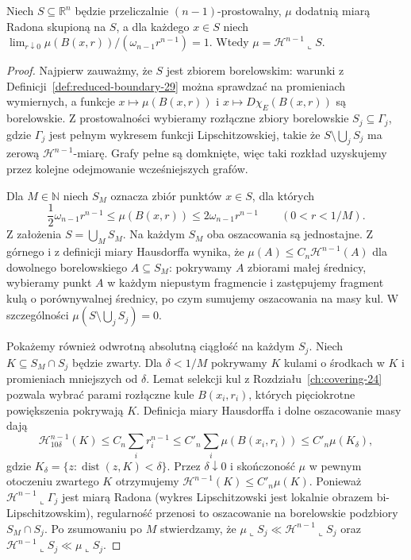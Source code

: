 \begin{lemat}
\label{lem:dg-density-identification}
Niech $S\subseteq\mathbb R^n$ będzie przeliczalnie
$(n-1)$-prostowalny, $\mu$ dodatnią miarą Radona
skupioną na $S$, a dla każdego $x\in S$ niech
$\lim_{r\downarrow0}\mu(B(x,r))/
(\omega_{n-1}r^{n-1})=1$.
Wtedy $\mu=\mathcal H^{n-1}\llcorner S$.
\end{lemat}
\begin{proof}
Najpierw zauważmy, że $S$ jest zbiorem borelowskim:
warunki z Definicji~\ref{def:reduced-boundary-29}
można sprawdzać na promieniach wymiernych,
a funkcje $x\mapsto\mu(B(x,r))$ i
$x\mapsto D\chi_E(B(x,r))$ są borelowskie.
Z prostowalności wybieramy rozłączne zbiory
borelowskie $S_j\subseteq\Gamma_j$, gdzie $\Gamma_j$
jest pełnym wykresem funkcji Lipschitzowskiej,
takie że $S\setminus\bigcup_jS_j$ ma zerową
$\mathcal H^{n-1}$-miarę. Grafy pełne są
domknięte, więc taki rozkład uzyskujemy
przez kolejne odejmowanie wcześniejszych grafów.

Dla $M\in\mathbb N$ niech $S_M$ oznacza
zbiór punktów $x\in S$, dla których
\[
 \frac12\omega_{n-1}r^{n-1}
 \le\mu(B(x,r))\le2\omega_{n-1}r^{n-1}
 \qquad(0<r<1/M).
\]
Z założenia $S=\bigcup_MS_M$.
Na każdym $S_M$ oba oszacowania są jednostajne.
Z górnego i z definicji miary Hausdorffa wynika,
że $\mu(A)\le C_n\mathcal H^{n-1}(A)$
dla dowolnego borelowskiego $A\subseteq S_M$:
pokrywamy $A$ zbiorami małej średnicy,
wybieramy punkt $A$ w każdym niepustym
fragmencie i zastępujemy fragment kulą o
porównywalnej średnicy, po czym sumujemy
oszacowania na masy kul. W szczególności
$\mu(S\setminus\bigcup_jS_j)=0$.

Pokażemy również odwrotną absolutną ciągłość
na każdym $S_j$. Niech
$K\subseteq S_M\cap S_j$ będzie zwarty.
Dla $\delta<1/M$ pokrywamy $K$ kulami
o środkach w $K$ i promieniach mniejszych
od $\delta$. Lemat selekcji kul z
Rozdziału~\ref{ch:covering-24} pozwala wybrać
parami rozłączne kule $B(x_i,r_i)$, których
pięciokrotne powiększenia pokrywają $K$.
Definicja miary Hausdorffa i dolne oszacowanie
masy dają
\[
 \mathcal H^{n-1}_{10\delta}(K)
 \le C_n\sum_i r_i^{n-1}
 \le C'_n\sum_i\mu(B(x_i,r_i))
 \le C'_n\mu(K_\delta),
\]
gdzie $K_\delta=\{z:\operatorname{dist}(z,K)<\delta\}$.
Przez $\delta\downarrow0$ i skończoność
$\mu$ w pewnym otoczeniu zwartego $K$
otrzymujemy $\mathcal H^{n-1}(K)\le C'_n\mu(K)$.
Ponieważ $\mathcal H^{n-1}\llcorner\Gamma_j$
jest miarą Radona (wykres Lipschitzowski
jest lokalnie obrazem bi-Lipschitzowskim),
regularność przenosi to oszacowanie na borelowskie
podzbiory $S_M\cap S_j$.
Po zsumowaniu po $M$ stwierdzamy, że
$\mu\llcorner S_j\ll\mathcal H^{n-1}\llcorner S_j$
oraz $\mathcal H^{n-1}\llcorner S_j\ll\mu\llcorner S_j$.


\end{proof}
